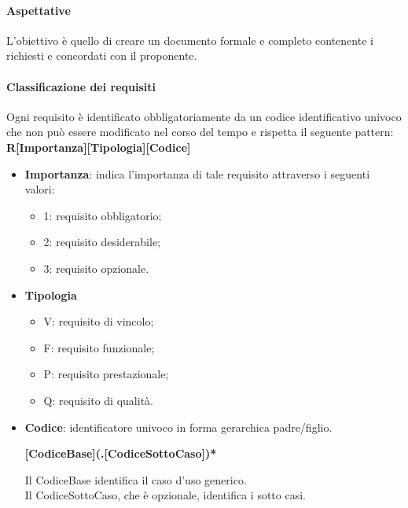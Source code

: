 \paragraph{Aspettative}
L'obiettivo è quello di creare un documento formale e completo contenente i  richiesti e concordati con il proponente.

\paragraph{Classificazione dei requisiti} \label{_classificazioneRequisiti}
Ogni requisito è identificato obbligatoriamente da un codice identificativo univoco che non può essere modificato nel corso del tempo e rispetta il seguente pattern: \\
\textbf{R[Importanza][Tipologia][Codice]}

\begin{itemize}
  \item 	\textbf{Importanza}: indica l'importanza di tale requisito attraverso i seguenti valori:
        \begin{itemize}
          \item 1: requisito obbligatorio;
          \item 2: requisito desiderabile;
          \item 3: requisito opzionale.
        \end{itemize}
  \item \textbf{Tipologia}
        \begin{itemize}
          \item V: requisito di vincolo;
          \item F: requisito funzionale;
          \item P: requisito prestazionale;
          \item Q: requisito di qualità.
        \end{itemize}
  \item \textbf{Codice}: identificatore univoco in forma gerarchica padre/figlio.
        \begin{center}
          \textbf{[CodiceBase](.[CodiceSottoCaso])*} \\
        \end{center}


        Il CodiceBase identifica il caso d'uso generico. \\
        Il CodiceSottoCaso, che è opzionale, identifica i sotto casi.
\end{itemize}

